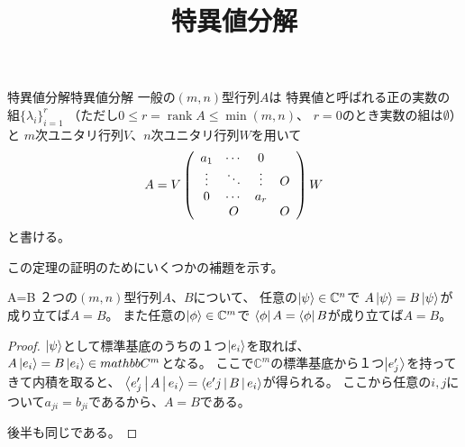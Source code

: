 \documentclass[a4paper, 10pt]{jsarticle}
\title{特異値分解}
\author{}
\DeclareMathOperator{\rank}{rank}
\begin{document}
\maketitle

\begin{thm}{特異値分解}{特異値分解}
	一般の$(m, n)$型行列$A$は
	特異値と呼ばれる正の実数の組$\{ \lambda_i \}_{i=1}^r$
	（ただし$0 \leq r = \rank A\leq \min (m, n)$、
	$r=0$のとき実数の組は$\emptyset$）と
	$m$次ユニタリ行列$V$、$n$次ユニタリ行列$W$を用いて
	\begin{align}
		A = V \left( \begin{array}{cccc}
			a_1 & \cdots & 0 & \\
			\vdots & \ddots & \vdots & \Huge{O} \\
			0 & \cdots & a_r & \\
			& \Huge{O} & & \Huge{O}
		\end{array} \right) W
	\end{align}
	と書ける。
\end{thm}

この定理の証明のためにいくつかの補題を示す。
\begin{lem}{}{A=B}
	２つの$(m, n)$型行列$A$、$B$について、
	任意の$\Ket{\psi} \in \mathbb{C}^n$で
	$A \Ket{\psi} = B \Ket{\psi}$が成り立てば$A = B$。
	また任意の$\Ket{\phi} \in \mathbb{C}^m$で
	$\Bra{\phi} A = \Bra{\phi} B$が成り立てば$A = B$。
\end{lem}
\begin{proof}
	$\Ket{\psi}$として標準基底のうちの１つ$\Ket{e_i}$を取れば、
	$A \Ket{e_i} = B \Ket{e_i} \in mathbb{C}^m$となる。
	ここで$\mathbb{C}^m$の標準基底から１つ$\Ket{e'_j}$を持ってきて内積を取ると、
	$\Braket{e'_j | A | e_i} = \Braket{e'j | B | e_i}$が得られる。
	ここから任意の$i, j$について$a_{ji} = b_{ji}$であるから、$A = B$である。
	
	後半も同じである。
\end{proof}
\end{document}
